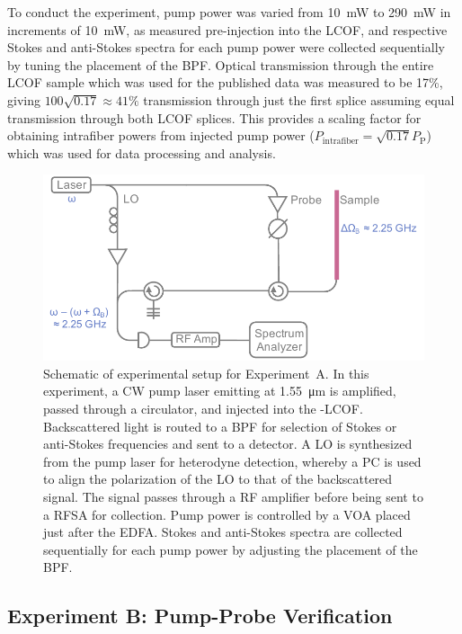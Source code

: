 To conduct the experiment, pump power was varied from \SI{10}{\milli\watt} to \SI{290}{\milli\watt} in increments of \SI{10}{\milli\watt}, as measured pre-injection into the \ac{LCOF}, and respective Stokes and anti-Stokes spectra for each pump power were collected sequentially by tuning the placement of the \ac{BPF}. Optical transmission through the entire \ac{LCOF} sample which was used for the published data was measured to be 17\%, giving \(100\sqrt{0.17} \approx 41\%\) transmission through just the first splice assuming equal transmission through both \ac{LCOF} splices. This provides a scaling factor for obtaining intrafiber powers from injected pump power (\(P_{\mathrm{intrafiber}} = \sqrt{0.17}P_{\mathrm{P}}\)) which was used for data processing and analysis.

\begin{figure}[t]
  \centering
  \includegraphics[width=\textwidth]{figs/3-Cooling/pumpOnlyDesign.pdf}
  \caption{Schematic of experimental setup for Experiment~A. In this experiment, a \ac{CW} pump laser emitting at \SI{1.55}{\micro\meter} is amplified, passed through a circulator, and injected into the -\ac{LCOF}. Backscattered light is routed to a \ac{BPF} for selection of Stokes or anti-Stokes frequencies and sent to a detector. A \ac{LO} is synthesized from the pump laser for heterodyne detection, whereby a \acl{PC} is used to align the polarization of the \ac{LO} to that of the backscattered signal. The signal passes through a \acl{RF} amplifier before being sent to a \ac{RFSA} for collection. Pump power is controlled by a \ac{VOA} placed just after the \ac{EDFA}. Stokes and anti-Stokes spectra are collected sequentially for each pump power by adjusting the placement of the \ac{BPF}.}
  \label{fig:Cooling:ExperimentADesign}
\end{figure}

\subsection{Experiment B: Pump-Probe Verification}
\label{Cooling:subsec:ExperimentBPump-ProbeVerification}


